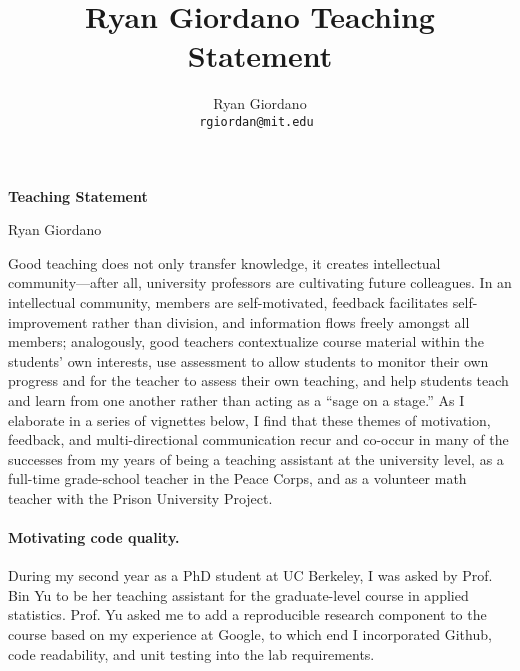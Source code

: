 

\usepackage{enumitem}

\usepackage{geometry}
\geometry{top=0.9in}
\geometry{left=1.2in}
\geometry{right=1.2in}


\title{Ryan Giordano Teaching Statement}

\author{
  Ryan Giordano \\ \texttt{rgiordan@mit.edu }
}




\begin{minipage}[t]{0.5\textwidth}
\hspace{-2em} %
{\bf \LARGE Teaching Statement}\\
\end{minipage}
\begin{minipage}[t]{0.5\textwidth}
        \hspace{8em} %
        {\LARGE Ryan Giordano}
\end{minipage}

Good teaching does not only transfer knowledge, it creates intellectual
community---after all, university professors are cultivating future colleagues.
In an intellectual community, members are self-motivated, feedback facilitates
self-improvement rather than division, and information flows freely amongst all
members; analogously, good teachers contextualize course material within the
students' own interests, use assessment to allow students to monitor their own
progress and for the teacher to assess their own teaching, and help students
teach and learn from one another rather than acting as a ``sage on a stage.'' As
I elaborate in a series of vignettes below, I find that these themes of
motivation, feedback, and multi-directional communication recur and co-occur in
many of the successes from my years of being a teaching assistant at the
university level, as a full-time grade-school teacher in the Peace Corps, and as
a volunteer math teacher with the Prison University Project.

\paragraph{Motivating code quality.}
%
During my second year as a PhD student at UC Berkeley, I was asked by Prof. Bin
Yu to be her teaching assistant for the graduate-level course in applied
statistics.
Prof. Yu asked me to add a reproducible research component to the course based
on my experience at Google, to which end I incorporated Github, code
readability, and unit testing into the lab requirements.

